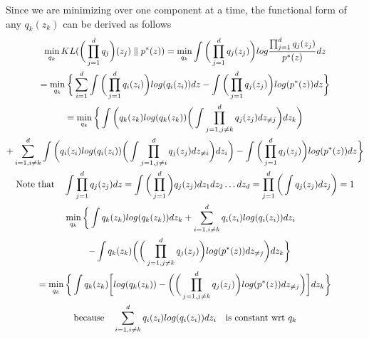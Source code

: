 \documentclass[../../statistical_learning_notes.tex]{subfiles}
\begin{document}
Since we are minimizing over one component at a time, the functional form of any $q_{k}(z_{k})$ can be derived as follows
\begin{gather*}
    \min_{q_{k}} KL(\bigg(\prod_{j=1}^{d}q_{j} \bigg)(z_{j}) \parallel p^{*}(z)) = \min_{q_{k}} \int \bigg(\prod_{j=1}^{d}q_{j}(z_{j}) \bigg) log \frac{\prod_{j=1}^{d}q_{j}(z_{j})}{p^{*}(z)} dz \\
    = \min_{q_{k}} \bigg\{ \sum_{i=1}^{d} \int \bigg(\prod_{j=1}^{d} q_{i}(z_{i}) \bigg) log(q_{i}(z_{i})) dz - \int \bigg(\prod_{j=1}^{d}q_{j}(z_{j})\bigg) log(p^{*}(z)) dz \bigg\}\\
    = \min_{q_{k}} \bigg\{ \int \bigg(q_{k}(z_{k})log(q_{k}(z_{k})) \bigg( \int \prod_{j=1, j\neq k}^{d} q_{j}(z_{j}) dz_{\neq j} \bigg) dz_{k} \bigg)\\ + \sum_{i=1, i\neq k}^{d} \int \bigg( q_{i}(z_{i})log(q_{i}(z_{i})) \bigg( \int \prod_{j=1,j \neq i}^{d}q_{j}(z_{j}) dz_{\neq i} \bigg) dz_{i}\bigg) - \int \bigg(\prod_{j=1}^{d}q_{j}(z_{j})\bigg) log(p^{*}(z)) dz \bigg\}\\
    \text{Note that} \quad \int \prod_{j=1}^{d} q_{j}(z_{j}) dz = \int \bigg(\prod_{j=1}^{d} \bigg) q_{j}(z_{j}) dz_{1} dz_{2}\ldots dz_{d} = \prod_{j=1}^{d} \bigg( \int q_{j}(z_{j}) dz_{j}\bigg) = 1\\
    \min_{q_{k}} \bigg\{ \int q_{k}(z_{k})log(q_{k}(z_{k})) dz_{k} + \sum_{i=1, i\neq k}^{d} q_{i}(z_{i})log(q_{i}(z_{i})) dz_{i} \quad \\ \quad  -\int q_{k}(z_{k}) \bigg(\bigg(\prod_{j=1,j\neq k}^{d}q_{j}(z_{j})\bigg) log(p^{*}(z)) dz_{\neq j} \bigg) dz_{k} \bigg\}\\
    = \min_{q_{k}} \bigg\{ \int q_{k}(z_{k}) \bigg[ log(q_{k}(z_{k})) - \bigg(\bigg(\prod_{j=1,j\neq k}^{d}q_{j}(z_{j})\bigg) log(p^{*}(z)) dz_{\neq j} \bigg) \bigg] dz_{k} \bigg \}\\
    \text{because} \quad \sum_{i=1, i\neq k}^{d} q_{i}(z_{i})log(q_{i}(z_{i})) dz_{i} \quad \text{is constant wrt $q_{k}$}
\end{gather*}
\end{document}
